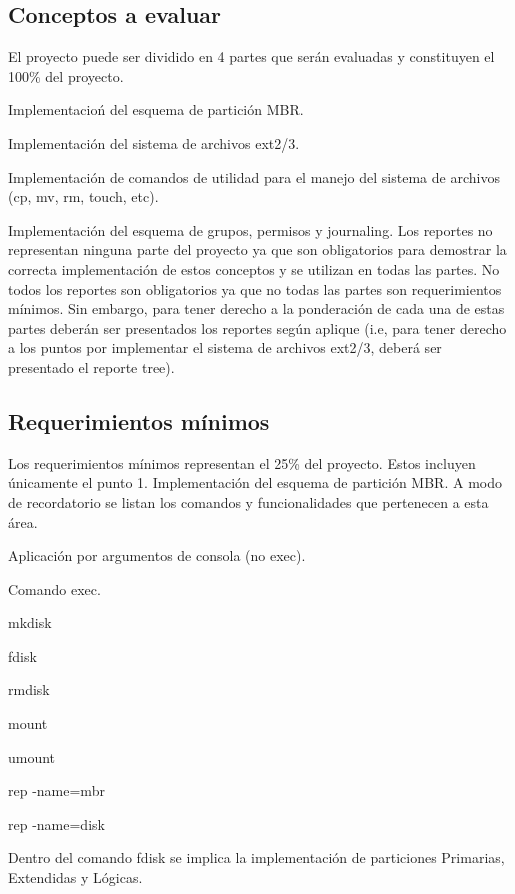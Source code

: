 \subsection*{Conceptos a evaluar}

El proyecto puede ser dividido en 4 partes que serán evaluadas y constituyen el 100\% del proyecto.
\begin{DoxyEnumerate}
\item Implementacioń del esquema de partición M\+BR.
\item Implementación del sistema de archivos ext2/3.
\item Implementación de comandos de utilidad para el manejo del sistema de archivos (cp, mv, rm, touch, etc).
\item Implementación del esquema de grupos, permisos y journaling. Los reportes no representan ninguna parte del proyecto ya que son obligatorios para demostrar la correcta implementación de estos conceptos y se utilizan en todas las partes. No todos los reportes son obligatorios ya que no todas las partes son requerimientos mínimos. Sin embargo, para tener derecho a la ponderación de cada una de estas partes deberán ser presentados los reportes según aplique (i.\+e, para tener derecho a los puntos por implementar el sistema de archivos ext2/3, deberá ser presentado el reporte tree).
\end{DoxyEnumerate}

\subsection*{Requerimientos mínimos}

Los requerimientos mínimos representan el 25\% del proyecto. Estos incluyen únicamente el punto 1. Implementación del esquema de partición M\+BR. A modo de recordatorio se listan los comandos y funcionalidades que pertenecen a esta área.
\begin{DoxyItemize}
\item Aplicación por argumentos de consola (no exec).
\item Comando exec.
\item mkdisk
\item fdisk
\item rmdisk
\item mount
\item umount
\item rep -\/name=mbr
\item rep -\/name=disk
\item Dentro del comando fdisk se implica la implementación de particiones Primarias, Extendidas y Lógicas.
\end{DoxyItemize}

